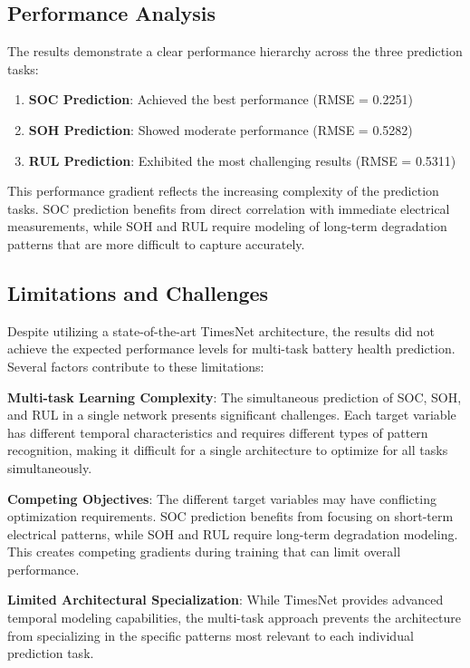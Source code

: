\subsection{Performance Analysis}
\label{subsec:performance_analysis}

The results demonstrate a clear performance hierarchy across the three prediction tasks:

\begin{enumerate}
    \item \textbf{SOC Prediction}: Achieved the best performance (RMSE = 0.2251)
    \item \textbf{SOH Prediction}: Showed moderate performance (RMSE = 0.5282)
    \item \textbf{RUL Prediction}: Exhibited the most challenging results (RMSE = 0.5311)
\end{enumerate}

This performance gradient reflects the increasing complexity of the prediction tasks. SOC prediction benefits from direct correlation with immediate electrical measurements, while SOH and RUL require modeling of long-term degradation patterns that are more difficult to capture accurately.

\subsection{Limitations and Challenges}
\label{subsec:limitations}

Despite utilizing a state-of-the-art TimesNet architecture, the results did not achieve the expected performance levels for multi-task battery health prediction. Several factors contribute to these limitations:

\textbf{Multi-task Learning Complexity}: The simultaneous prediction of SOC, SOH, and RUL in a single network presents significant challenges. Each target variable has different temporal characteristics and requires different types of pattern recognition, making it difficult for a single architecture to optimize for all tasks simultaneously.

\textbf{Competing Objectives}: The different target variables may have conflicting optimization requirements. SOC prediction benefits from focusing on short-term electrical patterns, while SOH and RUL require long-term degradation modeling. This creates competing gradients during training that can limit overall performance.

\textbf{Limited Architectural Specialization}: While TimesNet provides advanced temporal modeling capabilities, the multi-task approach prevents the architecture from specializing in the specific patterns most relevant to each individual prediction task.

